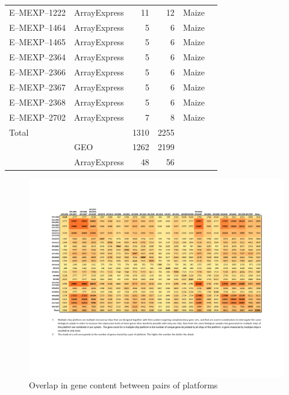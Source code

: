 \begin{ThreePartTable}
\begin{footnotesize}
\begin{longtable}{@{}|>{\centering\arraybackslash}p{2.5cm} | 
>{\centering\arraybackslash}p{1.5cm} rr 
>{\scriptsize\raggedright}p{2.5cm} c |@{}}
E--MEXP--1222 & ArrayExpress & 11 & 12 & Maize\tnote{2} & \\
E--MEXP--1464 & ArrayExpress & 5 & 6 & Maize\tnote{2} & \\
E--MEXP--1465 & ArrayExpress & 5 & 6 & Maize\tnote{2} & \\
E--MEXP--2364 & ArrayExpress & 5 & 6 & Maize\tnote{2} & \\
E--MEXP--2366 & ArrayExpress & 5 & 6 & Maize\tnote{2} & \\
E--MEXP--2367 & ArrayExpress & 5 & 6 & Maize\tnote{2} & \\
E--MEXP--2368 & ArrayExpress & 5 & 6 & Maize\tnote{2} & \\
E--MEXP--2702 & ArrayExpress & 7 & 8 & Maize\tnote{2} & \\
\midrule
Total & & 1310 & 2255 & & \\ \hline
& GEO & 1262 & 2199 & & \\ 
& ArrayExpress & 48 & 56 && \\
\bottomrule
\end{longtable}
\end{footnotesize}
\end{ThreePartTable}



\begin{figure}
	\centering
	\caption{Overlap in gene content between pairs of platforms}
	\label{fig:maize-platform-overlap}
	\includegraphics[trim=2cm 2cm 2cm 2cm, clip=true, width=1\textwidth] 	
		{ApdxB-overlap-TB.pdf}
\end{figure}


